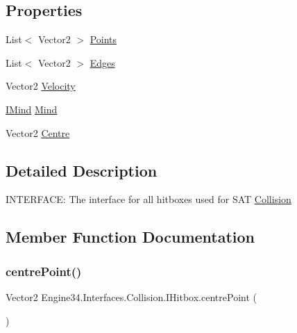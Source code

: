 \subsection*{Properties}
\begin{DoxyCompactItemize}
\item 
List$<$ Vector2 $>$ \hyperlink{a00434_adf3ddbfb39ee755496a5b66cbc6dc498}{Points}
\item 
List$<$ Vector2 $>$ \hyperlink{a00434_a21277c9cf2693302c836948c683692e9}{Edges}
\item 
Vector2 \hyperlink{a00434_a7b1549f95caadf4aa47757631724a33a}{Velocity}
\item 
\hyperlink{a00446}{I\+Mind} \hyperlink{a00434_abbe120cf43c047de61541acb812a1e7b}{Mind}
\item 
Vector2 \hyperlink{a00434_afa4a2607d8572fda7c7a8a8b120a3320}{Centre}
\end{DoxyCompactItemize}


\subsection{Detailed Description}
I\+N\+T\+E\+R\+F\+A\+CE\+: The interface for all hitboxes used for S\+AT \hyperlink{a00256}{Collision} 



\subsection{Member Function Documentation}
\mbox{\label{a00434_a5028f79a4e2537e578c528c932dee948}} 
\subsubsection{\texorpdfstring{centre\+Point()}{centrePoint()}}
{\footnotesize\ttfamily Vector2 Engine34.\+Interfaces.\+Collision.\+I\+Hitbox.\+centre\+Point (\begin{DoxyParamCaption}{ }\end{DoxyParamCaption})}




